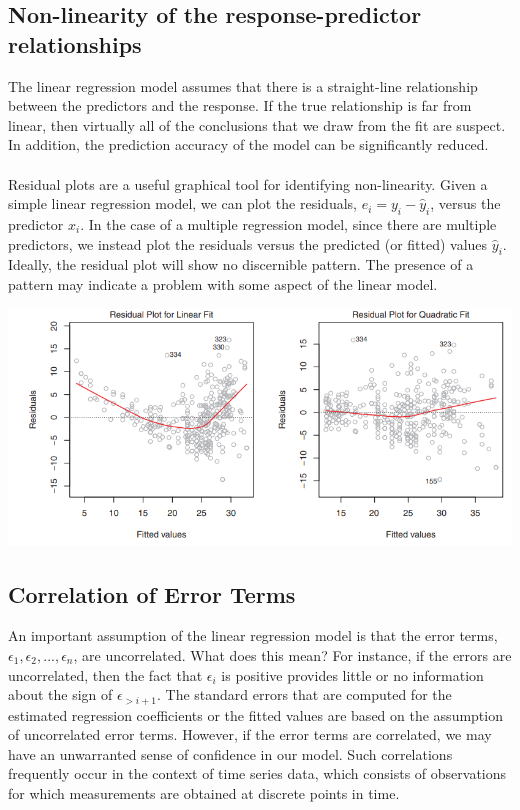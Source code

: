 \subsection{Non-linearity of the response-predictor relationships}
The linear regression model assumes that there is a straight-line relationship between the predictors and the response. If the true relationship is far from linear, then virtually all of the conclusions that we draw from the fit are suspect. In addition, the prediction accuracy of the model can be significantly reduced.
\\\\
Residual plots are a useful graphical tool for identifying non-linearity. Given a simple linear regression model, we can plot the residuals, $e_i = y_i - \hat{y}_i$, versus the predictor $x_i$. In the case of a multiple regression model, since there are multiple predictors, we instead plot the residuals versus the predicted (or fitted) values $\hat{y}_i$. Ideally, the residual plot will show no  discernible pattern. The presence of a pattern may indicate a problem with some aspect of the linear model.
\begin{center}
    \includegraphics[scale=0.8]{images/residual-plot.png}
\end{center}

\subsection{Correlation of Error Terms}
An important assumption of the linear regression model is that the error terms, $\epsilon_1, \epsilon_2,...,\epsilon_n$, are uncorrelated. What does this mean? For instance, if the errors are uncorrelated, then the fact that $\epsilon_i$ is positive provides little or no information about the sign of $\epsilon_{>i+1}$. The standard errors that are computed for the estimated regression coefficients or the fitted values are based on the assumption of uncorrelated error terms. However, if the error terms are correlated, we may have an unwarranted sense of confidence in our model. Such correlations frequently occur in the context of time series data, which consists of observations for which measurements are obtained at discrete points in time.

